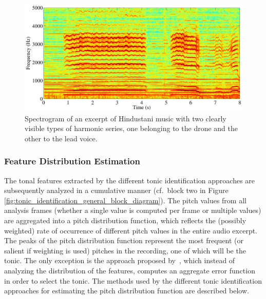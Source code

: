 {\begin{figure}
	\begin{center}
		\includegraphics[width=\figSizeNinety]{ch02_background/figures/2HarmonicSeries.pdf}
	\end{center}
	\caption{Spectrogram of an excerpt of Hindustani music with two clearly visible types of harmonic series, one belonging to the drone and the other to the lead voice.}
	\label{fig:2HarmonicSeries}
\end{figure}


\subsubsection{Feature Distribution Estimation}
\label{sec:background_tonic_feature_distribution_estimation}

The tonal features extracted by the different tonic identification approaches are subsequently analyzed in a cumulative manner (cf.~block two in Figure \ref{fig:tonic_identification_general_block_diagram}). The pitch values from all analysis frames (whether a single value is computed per frame or multiple values) are aggregated into a pitch distribution function, which reflects the (possibly weighted) rate of occurrence of different pitch values in the entire audio excerpt. The peaks of the pitch distribution function represent the most frequent (or salient if weighting is used) pitches in the recording, one of which will be the tonic. The only exception is the approach proposed by~\cite{Sengupta2005b}, which instead of analyzing the distribution of the features, computes an aggregate error function in order to select the tonic. The methods used by the different tonic identification approaches for estimating the pitch distribution function are described below.

}
